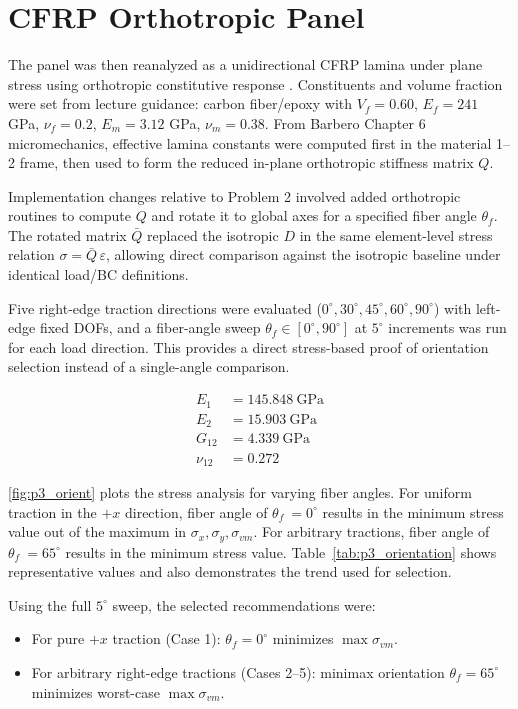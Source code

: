 \documentclass{article}
\begin{document}
\section*{CFRP Orthotropic Panel}

The panel was then reanalyzed as a unidirectional CFRP lamina under plane stress using orthotropic constitutive response \cite{barbero_composite_fea}. Constituents and volume fraction were set from lecture guidance: carbon fiber/epoxy with $V_f=0.60$, $E_f=241$ GPa, $\nu_f=0.2$, $E_m=3.12$ GPa, $\nu_m=0.38$. From Barbero Chapter 6 micromechanics, effective lamina constants were computed first in the material 1--2 frame, then used to form the reduced in-plane orthotropic stiffness matrix $Q$.

Implementation changes relative to Problem 2 involved added orthotropic routines to compute $Q$ and rotate it to global axes for a specified fiber angle $\theta_f$. The rotated matrix $\bar{Q}$ replaced the isotropic $D$ in the same element-level stress relation $\sigma=\bar{Q}\,\varepsilon$, allowing direct comparison against the isotropic baseline under identical load/BC definitions.

Five right-edge traction directions were evaluated ($0^\circ,30^\circ,45^\circ,60^\circ,90^\circ$) with left-edge fixed DOFs, and a fiber-angle sweep $\theta_f\in[0^\circ,90^\circ]$ at $5^\circ$ increments was run for each load direction. This provides a direct stress-based proof of orientation selection instead of a single-angle comparison.

\[
\begin{aligned}
E_1 &= 145.848\ \text{GPa} \\
E_2 &= 15.903\ \text{GPa} \\
G_{12} &= 4.339\ \text{GPa} \\
\nu_{12} &= 0.272
\end{aligned}
\]

\autoref{fig:p3_orient} plots the stress analysis for varying fiber angles. For uniform traction in the $+x$ direction, fiber angle of $\theta_f\ = 0^\circ$ results in the minimum stress value out of the maximum in $\sigma_x, \sigma_y, \sigma_{vm}$. For arbitrary tractions, fiber angle of $\theta_f\ = 65^\circ$ results in the minimum stress value. Table~\ref{tab:p3_orientation} shows representative values and also demonstrates the trend used for selection.

Using the full $5^\circ$ sweep, the selected recommendations were:
\begin{itemize}
    \item For pure $+x$ traction (Case 1): $\theta_f=0^\circ$ minimizes $\max \sigma_{vm}$.
    \item For arbitrary right-edge tractions (Cases 2--5): minimax orientation $\theta_f=65^\circ$ minimizes worst-case $\max \sigma_{vm}$.
\end{itemize}
\end{document}
